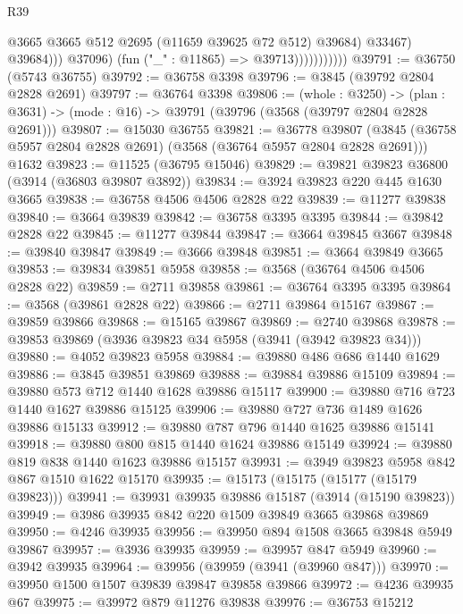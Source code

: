 \begin{lexlean}{R39}
\begin{coremodule}
                                    @3665
                                    @3665
                                    @512
                                    @2695
                                    (@11659 @39625 @72 @512)
                                    @39684)
                                  @33467)
                                @39684)))
                          @37096)
                        (fun ("_" : @11865) => @39713)))))))))))
@39791 := @36750 (@5743 @36755)
@39792 := @36758 @3398
@39796 := @3845 (@39792 @2804 @2828 @2691)
@39797 := @36764 @3398
@39806 := (whole : @3250) ->
  (plan : @3631) -> (mode : @16) -> @39791 (@39796 (@3568 (@39797 @2804 @2828 @2691)))
@39807 := @15030 @36755
@39821 := @36778
    @39807
    (@3845 (@36758 @5957 @2804 @2828 @2691) (@3568 (@36764 @5957 @2804 @2828 @2691)))
    @1632
@39823 := @11525 (@36795 @15046)
@39829 := @39821 @39823 @36800 (@3914 (@36803 @39807 @3892))
@39834 := @3924 @39823 @220 @445 @1630 @3665
@39838 := @36758 @4506 @4506 @2828 @22
@39839 := @11277 @39838
@39840 := @3664 @39839
@39842 := @36758 @3395 @3395
@39844 := @39842 @2828 @22
@39845 := @11277 @39844
@39847 := @3664 @39845 @3667
@39848 := @39840 @39847
@39849 := @3666 @39848
@39851 := @3664 @39849 @3665
@39853 := @39834 @39851 @5958
@39858 := @3568 (@36764 @4506 @4506 @2828 @22)
@39859 := @2711 @39858
@39861 := @36764 @3395 @3395
@39864 := @3568 (@39861 @2828 @22)
@39866 := @2711 @39864 @15167
@39867 := @39859 @39866
@39868 := @15165 @39867
@39869 := @2740 @39868
@39878 := @39853 @39869 (@3936 @39823 @34 @5958 (@3941 (@3942 @39823 @34)))
@39880 := @4052 @39823 @5958
@39884 := @39880 @486 @686 @1440 @1629
@39886 := @3845 @39851 @39869
@39888 := @39884 @39886 @15109
@39894 := @39880 @573 @712 @1440 @1628 @39886 @15117
@39900 := @39880 @716 @723 @1440 @1627 @39886 @15125
@39906 := @39880 @727 @736 @1489 @1626 @39886 @15133
@39912 := @39880 @787 @796 @1440 @1625 @39886 @15141
@39918 := @39880 @800 @815 @1440 @1624 @39886 @15149
@39924 := @39880 @819 @838 @1440 @1623 @39886 @15157
@39931 := @3949 @39823 @5958 @842 @867 @1510 @1622 @15170
@39935 := @15173 (@15175 (@15177 (@15179 @39823)))
@39941 := @39931 @39935 @39886 @15187 (@3914 (@15190 @39823))
@39949 := @3986 @39935 @842 @220 @1509 @39849 @3665 @39868 @39869
@39950 := @4246 @39935
@39956 := @39950 @894 @1508 @3665 @39848 @5949 @39867
@39957 := @3936 @39935
@39959 := @39957 @847 @5949
@39960 := @3942 @39935
@39964 := @39956 (@39959 (@3941 (@39960 @847)))
@39970 := @39950 @1500 @1507 @39839 @39847 @39858 @39866
@39972 := @4236 @39935 @67
@39975 := @39972 @879 @11276 @39838
@39976 := @36753 @15212

\end{coremodule}
\end{lexlean}
